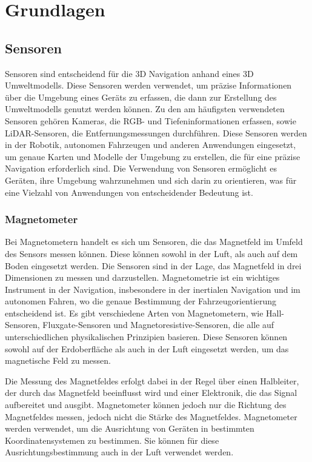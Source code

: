 \chapter{Grundlagen}

\section{Sensoren} \label{sensoren:section}

Sensoren sind entscheidend für die 3D Navigation anhand eines 3D Umweltmodells. Diese Sensoren werden verwendet, um präzise Informationen über die Umgebung eines Geräts zu erfassen, die dann zur Erstellung des Umweltmodells genutzt werden können. Zu den am häufigsten verwendeten Sensoren gehören Kameras, die RGB- und Tiefeninformationen erfassen, sowie LiDAR-Sensoren, die Entfernungsmessungen durchführen. Diese Sensoren werden in der Robotik, autonomen Fahrzeugen und anderen Anwendungen eingesetzt, um genaue Karten und Modelle der Umgebung zu erstellen, die für eine präzise Navigation erforderlich sind. Die Verwendung von Sensoren ermöglicht es Geräten, ihre Umgebung wahrzunehmen und sich darin zu orientieren, was für eine Vielzahl von Anwendungen von entscheidender Bedeutung ist.

    \subsection{Magnetometer} \label{magnetometer:subsection}

    Bei Magnetometern handelt es sich um Sensoren, die das Magnetfeld im Umfeld des Sensors messen können.
    Diese können sowohl in der Luft, als auch auf dem Boden eingesetzt werden.
    Die Sensoren sind in der Lage, das Magnetfeld in drei Dimensionen zu messen und darzustellen.
    Magnetometrie ist ein wichtiges Instrument in der Navigation, insbesondere in der inertialen Navigation und im autonomen Fahren, wo die genaue Bestimmung der Fahrzeugorientierung entscheidend ist. Es gibt verschiedene Arten von Magnetometern, wie Hall-Sensoren, Fluxgate-Sensoren und Magnetoresistive-Sensoren, die alle auf unterschiedlichen physikalischen Prinzipien basieren. Diese Sensoren können sowohl auf der Erdoberfläche als auch in der Luft eingesetzt werden, um das magnetische Feld zu messen.

    Die Messung des Magnetfeldes erfolgt dabei in der Regel über einen Halbleiter, der durch das Magnetfeld beeinflusst wird und einer Elektronik, die das Signal aufbereitet und ausgibt.
    Magnetometer können jedoch nur die Richtung des Magnetfeldes messen, jedoch nicht die Stärke des Magnetfeldes.
    Magnetometer werden verwendet, um die Ausrichtung von Geräten in bestimmten Koordinatensystemen zu bestimmen.
    Sie können für diese Ausrichtungsbestimmung auch in der Luft verwendet werden. 
 
